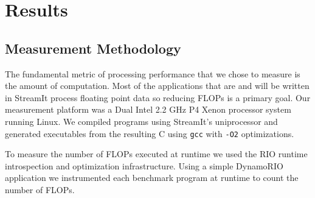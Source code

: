 \section{Results}

\subsection{Measurement Methodology}


The fundamental metric of processing performance that we chose to measure is the 
amount of computation. Most of the applications that are and will
be written in StreamIt process floating point data so reducing FLOPs
is a primary goal. Our measurement platform was a Dual Intel 2.2 GHz P4 Xenon processor system 
running Linux. We compiled programs using StreamIt's uniprocessor
and generated executables from the resulting C using {\tt gcc} with {\tt -O2} optimizations.

To measure the number of FLOPs executed at runtime we used the RIO\cite{rio-webpage}
runtime introspection and optimization infrastructure. Using a simple DynamoRIO application 
we instrumented each benchmark program at runtime to count the number of FLOPs.


